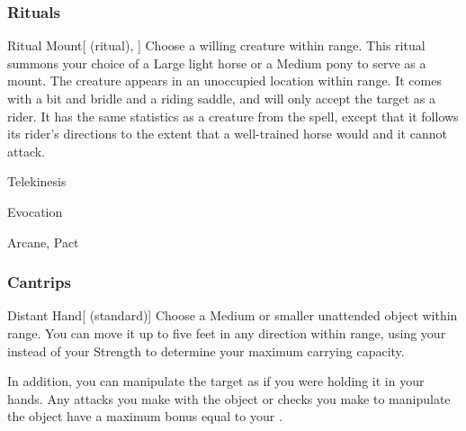 \subsubsection{Rituals}


\lowercase{\hypertarget{spell:Ritual Mount}{}}\label{spell:Ritual Mount}
\begin{attuneability}[\nth{2}]{\hypertarget{spell:Ritual Mount}{Ritual Mount}}[ (ritual), ]
Choose a willing creature within \rngclose range.
This ritual summons your choice of a Large light horse or a Medium pony to serve as a mount.
The creature appears in an unoccupied location within \rngclose range.
It comes with a bit and bridle and a riding saddle, and will only accept the target as a rider.
It has the same statistics as a creature from the  spell, except that it follows its rider's directions to the extent that a well-trained horse would and it cannot attack.
\end{attuneability}
\vspace{0.25em}


\newpage
\begin{spellsection}{Telekinesis}

\begin{spellheader}
\end{spellheader}


 Evocation

 Arcane, Pact

\subsubsection{Cantrips}


\begin{apability}{Distant Hand}[ (standard)]
Choose a Medium or smaller unattended object within \rngclose range.
You can move it up to five feet in any direction within range, using your  instead of your Strength to determine your maximum carrying capacity.

In addition, you can manipulate the target as if you were holding it in your hands.
Any attacks you make with the object or checks you make to manipulate the object have a maximum bonus equal to your .
\end{apability}

\end{spellsection}


